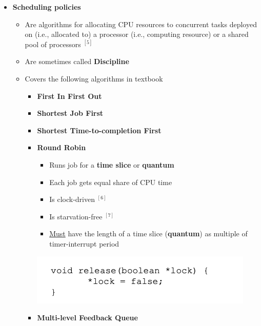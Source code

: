 \documentclass[12pt]{article}
\begin{document}
\begin{enumerate}[1.]
\begin{itemize}
        \item \textbf{Scheduling policies}

        \begin{itemize}
            \item Are algorithms for allocating CPU resources to concurrent tasks
            deployed on (i.e., allocated to) a processor (i.e., computing resource)
            or a shared pool of processors $^{[5]}$
            \item Are sometimes called \textbf{Discipline}
            \item Covers the following algorithms in textbook

            \begin{itemize}
                \item \textbf{First In First Out}
                \item \textbf{Shortest Job First}
                \item \textbf{Shortest Time-to-completion First}
                \item \textbf{Round Robin}

                \begin{itemize}
                    \item Runs job for a \textbf{time slice} or \textbf{quantum}
                    \item Each job gets equal share of CPU time
                    \item Is clock-driven $^{[6]}$
                    \item Is starvation-free $^{[7]}$
                    \item \underline{Must} have the length of a time slice (\textbf{quantum}) as multiple of timer-interrupt period
                \end{itemize}

                \bigskip

                \begin{center}
                \includegraphics[width=0.7\linewidth]{images/midterm_2_solution_4.png}
                \end{center}
                \item \textbf{Multi-level Feedback Queue}
            \end{itemize}
        \end{itemize}


\end{itemize}
\end{enumerate}
\end{document}
